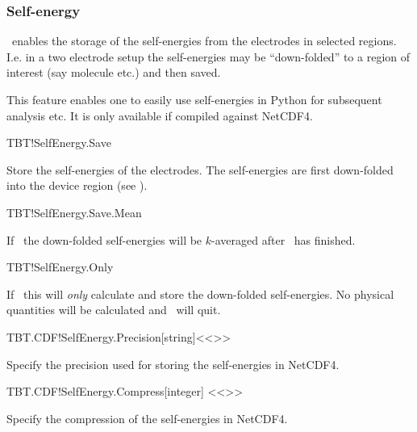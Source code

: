 \subsubsection{Self-energy}
\label{sec:self-energy}

\tbtrans\ enables the storage of the self-energies from the electrodes
in selected regions. I.e. in a two electrode setup the self-energies
may be ``down-folded'' to a region of interest (say molecule etc.) and
then saved.

This feature enables one to easily use self-energies in Python for
subsequent analysis etc. It is only available if compiled against
NetCDF4. 

\begin{fdflogicalF}{TBT!SelfEnergy.Save}

  Store the self-energies of the electrodes. The self-energies are
  first down-folded into the device region (see
  ).

\end{fdflogicalF}

\begin{fdflogicalF}{TBT!SelfEnergy.Save.Mean}

  If \fdftrue\ the down-folded self-energies will be $k$-averaged
  after \tbtrans\ has finished.
  
\end{fdflogicalF}


\begin{fdflogicalF}{TBT!SelfEnergy.Only}
  
  If \fdftrue\ this will \emph{only} calculate and store the
  down-folded self-energies. No physical quantities will be calculated
  and \tbtrans\ will quit. 
  
\end{fdflogicalF}


\begin{fdfentry}{TBT.CDF!SelfEnergy.Precision}[string]<{<>}>

  Specify the precision used for storing the self-energies in NetCDF4.

\end{fdfentry}


\begin{fdfentry}{TBT.CDF!SelfEnergy.Compress}[integer]%
  <{<>}>

  Specify the compression of the self-energies in NetCDF4.
  
\end{fdfentry}


